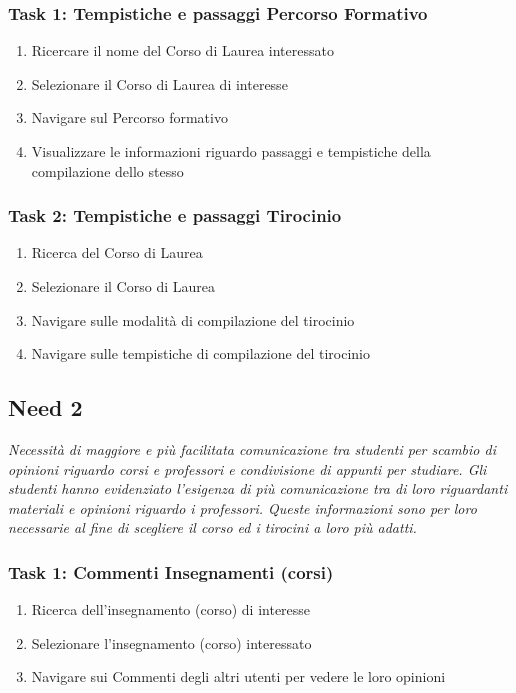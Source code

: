 \subsubsection{Task 1: Tempistiche e passaggi Percorso Formativo}
\begin{enumerate}
    \item Ricercare il nome del Corso di Laurea interessato
    \item Selezionare il Corso di Laurea di interesse
    \item Navigare sul Percorso formativo
    \item Visualizzare le informazioni riguardo passaggi e tempistiche della compilazione dello stesso
\end{enumerate}

\subsubsection{Task 2: Tempistiche e passaggi Tirocinio}
\begin{enumerate}
    \item Ricerca del Corso di Laurea
    \item Selezionare il Corso di Laurea
    \item Navigare sulle modalità di compilazione del tirocinio 
    \item Navigare sulle tempistiche di compilazione del tirocinio
\end{enumerate} 

\subsection{Need 2}
\begin{center}
    \textit{Necessità di maggiore e più facilitata comunicazione tra studenti per scambio di opinioni riguardo corsi e professori e condivisione di appunti per studiare. 
    Gli studenti hanno evidenziato l’esigenza di più comunicazione tra di loro riguardanti materiali e opinioni riguardo i professori. Queste informazioni sono per loro necessarie al fine di scegliere il corso ed i tirocini a loro più adatti.}
\end{center}
\subsubsection{Task 1: Commenti Insegnamenti (corsi)}
\begin{enumerate}
    \item Ricerca dell'insegnamento (corso) di interesse
    \item Selezionare l'insegnamento (corso) interessato
    \item Navigare sui Commenti degli altri utenti per vedere le loro opinioni
\end{enumerate}

